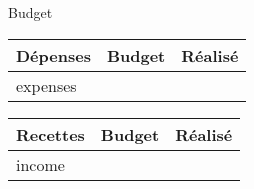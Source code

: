 \documentclass[10 pt]{report}
\begin{document}
\centerline{\Huge Budget}

\begin{minipage}[t]{.47\textwidth}
  \begin{tabu} to \linewidth {|X|r|r|}
    \hline
    Dépenses & Budget & Réalisé \\
    \hline
    \hline
    {{expenses}}
    \hline
  \end{tabu}
\end{minipage}
\begin{minipage}[t]{.47\textwidth}
  \begin{tabu} to \linewidth {|X|r|r|}
    \hline
    Recettes & Budget & Réalisé \\
    \hline
    \hline
    {{income}}
    \hline
  \end{tabu}
\end{minipage}
\end{document}
